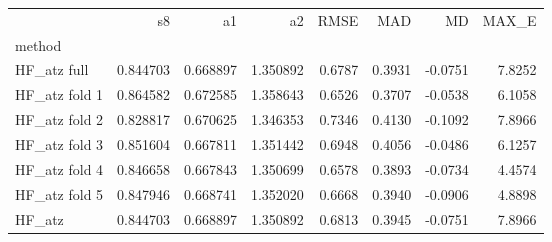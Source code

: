 \begin{tabular}{lrrrrrrr}
 & s8 & a1 & a2 & RMSE & MAD & MD & MAX_E \\
method &  &  &  &  &  &  &  \\
HF_atz full & 0.844703 & 0.668897 & 1.350892 & 0.6787 & 0.3931 & -0.0751 & 7.8252 \\
HF_atz fold 1 & 0.864582 & 0.672585 & 1.358643 & 0.6526 & 0.3707 & -0.0538 & 6.1058 \\
HF_atz fold 2 & 0.828817 & 0.670625 & 1.346353 & 0.7346 & 0.4130 & -0.1092 & 7.8966 \\
HF_atz fold 3 & 0.851604 & 0.667811 & 1.351442 & 0.6948 & 0.4056 & -0.0486 & 6.1257 \\
HF_atz fold 4 & 0.846658 & 0.667843 & 1.350699 & 0.6578 & 0.3893 & -0.0734 & 4.4574 \\
HF_atz fold 5 & 0.847946 & 0.668741 & 1.352020 & 0.6668 & 0.3940 & -0.0906 & 4.8898 \\
HF_atz & 0.844703 & 0.668897 & 1.350892 & 0.6813 & 0.3945 & -0.0751 & 7.8966 \\
\end{tabular}

